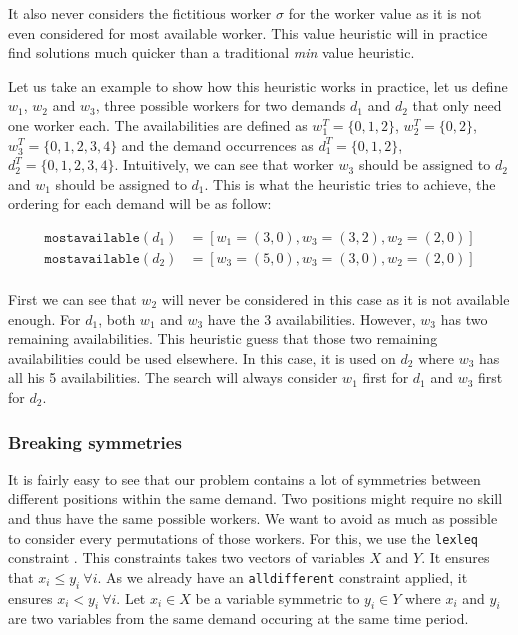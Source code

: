 \documentclass[../../thesis.tex]{subfiles}
\begin{document}
It also never considers the fictitious worker $\sigma$ for the worker value as it is not even considered 
for most available worker. This value heuristic will in practice find solutions much quicker than a traditional \emph{min} value heuristic.

Let us take an example to show how this heuristic works in practice, let us define 
$w_1$, $w_2$ and $w_3$, three possible workers for two demands $d_1$ and $d_2$ that only need one worker each.
The availabilities are defined as
$w_1^T = \{ 0, 1, 2 \}$, $w_2^T = \{ 0, 2 \}$, $w_3^T = \{ 0, 1, 2, 3, 4\}$ and the demand occurrences as 
$d_1^T = \{ 0, 1, 2 \}$, $d_2^T = \{ 0, 1, 2, 3, 4 \}$. Intuitively, we can see that worker 
$w_3$ should be assigned to $d_2$ and $w_1$ should be assigned to $d_1$. This is what the heuristic tries to achieve, the ordering for each demand will be as follow:

\begin{align*}
  \texttt{mostavailable}(d_1) &= [w_1 = (3, 0), w_3 = (3, 2), w_2 = (2, 0)] \\ 
  \texttt{mostavailable}(d_2) &= [w_3 = (5, 0), w_3 = (3, 0), w_2 = (2, 0)] \\ 
\end{align*}

First we can see that $w_2$ will never be considered in this case as it is not available enough. For $d_1$, both $w_1$ and $w_3$ have the 3 availabilities. However, 
$w_3$ has two remaining availabilities. This heuristic guess that those two remaining availabilities could be used elsewhere. In this case, it is used on $d_2$ where $w_3$ has all his 5 availabilities.
The search will always consider $w_1$ first for $d_1$ and $w_3$ first for $d_2$.

\subsubsection{Breaking symmetries}

It is fairly easy to see that our problem contains a lot of symmetries between different positions within the same demand. 
Two positions might require no skill and thus have the same possible workers. We want to avoid as much as possible to consider every permutations of those workers.
For this, we use the \texttt{lexleq} constraint \cite{Alan:Lex}. This constraints takes two vectors of variables $X$ and $Y$. It ensures that 
$x_i \leq y_i \ \forall i$. As we already have an \texttt{alldifferent} constraint applied, it ensures $x_i < y_i \ \forall i$.
Let $x_i \in X$ be a variable symmetric to $y_i \in Y$ where $x_i$ and $y_i$ are two variables from the same demand occuring at the same time period.
\end{document}
